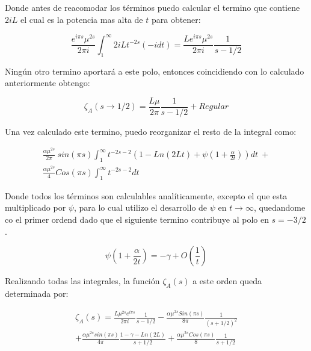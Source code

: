 Donde antes de reacomodar los términos puedo calcular el termino que contiene $2iL$ el cual es la potencia mas alta de $t$ para obtener: 

\begin{equation}
    \frac{e^{i \pi s} \mu ^{2s} }{2 \pi i }
    \int _1 ^{\infty}
    2 i L    
    t ^{-2 s}
    (-i dt) =  
    \frac{L e^{i \pi s} \mu ^{2s}}{2 \pi i} \frac{1}{s-1/2   }
\end{equation}

Ningún otro termino aportará a este polo, entonces coincidiendo con lo calculado anteriormente obtengo:

\begin{equation}
    \zeta _A  (s \rightarrow 1/2) = \frac{L \mu }{2 \pi} \frac{1}{s- 1/2 } + Regular
\end{equation}


Una vez calculado este termino, puedo reorganizar el resto de la integral como:

\begin{equation}
\begin{array}{c}
    \frac{\alpha \mu ^{2s} }{2 \pi} \ sin(\pi s)
    \int _1 ^{\infty}
    t ^{-2 s-2} 
    \left(
    1 - Ln(2Lt) + \psi (1 + \frac{\alpha}{2t})
    \right) dt \ + \\ 
    \frac{\alpha \mu ^{2s} }{4} 
    Cos(\pi s)
    \int _1 ^{\infty} t^{-2s-2} dt
\end{array}
\end{equation}

Donde todos los términos son calculables analíticamente, excepto el que esta multiplicado por $\psi$, para lo cual utilizo el desarrollo de $\psi$ en $t \rightarrow \infty$, quedandome co el primer ordend dado que el siguiente termino contribuye al polo en $s = -3/2$.

\begin{equation}
    \psi(1 + \frac{\alpha}{2 t}) =
    - \gamma + O \left( \frac{1}{t} \right)
\end{equation}

Realizando todas las integrales, la función $ \zeta _A (s)$ a este orden queda determinada por:  

\begin{equation}
\begin{array}{c}
    \zeta _A (s)  = 
    \frac{L \mu ^{2 s} e ^{i \pi s}}{2 \pi i} \frac{1}{s-1/2} 
    -\frac{\alpha \mu ^{2s} Sin(\pi s)}{8 \pi} \frac{1}{(s+1/2) ^2} \\
    + \frac{\alpha \mu ^{2s} sin (\pi s) }{4 \pi } \frac{1 - \gamma -  Ln(2 L)}{s+1/2}
    + \frac{\alpha \mu ^{2s} Cos(\pi s)}{8} \frac{1}{s+1/2}
    
\end{array}
\end{equation}



